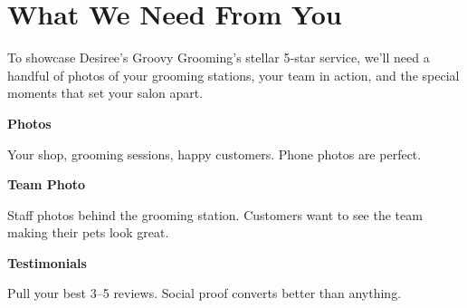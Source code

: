 \documentclass[11pt,letterpaper]{article}
\begin{document}
\vspace{0.2em}

\section*{What We Need From You}

\noindent To showcase Desiree's Groovy Grooming’s stellar 5‑star service, we’ll need a handful of photos of your grooming stations, your team in action, and the special moments that set your salon apart.

\noindent\begin{minipage}[t]{0.48\textwidth}
\begin{tcolorbox}[colframe=accent-teal, boxrule=1pt, left=0.7em, right=0.7em, top=0.5em, bottom=0.5em, arc=4pt, boxsep=0pt]
{\bfseries\small\color{accent-teal}Photos}

\vspace{0.15em}

{\small Your shop, grooming sessions, happy customers. Phone photos are perfect.}
\end{tcolorbox}

\vspace{0.1em}

\begin{tcolorbox}[colframe=accent-teal, boxrule=1pt, left=0.7em, right=0.7em, top=0.5em, bottom=0.5em, arc=4pt, boxsep=0pt]
{\bfseries\small\color{accent-teal}Team Photo}

\vspace{0.15em}

{\small Staff photos behind the grooming station. Customers want to see the team making their pets look great.}
\end{tcolorbox}

\vspace{0.1em}

\begin{tcolorbox}[colframe=accent-teal, boxrule=1pt, left=0.7em, right=0.7em, top=0.5em, bottom=0.5em, arc=4pt, boxsep=0pt]
{\bfseries\small\color{accent-teal}Testimonials}

\vspace{0.15em}

{\small Pull your best 3--5 reviews. Social proof converts better than anything.}
\end{tcolorbox}
\end{minipage}
\hfill
\end{document}
